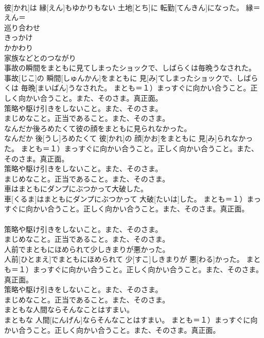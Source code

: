 \documentclass[8pt]{extreport}
\begin{document}
\begin{CJK}{UTF8}{min}
{\\	彼[かれ]は 縁[えん]もゆかりもない 土地[とち]に 転勤[てんきん]になった。	縁＝えん＝ 
\\	巡り合わせ
\\	きっかけ
\\	かかわり
\\	家族などとのつながり
\\	事故の瞬間をまともに見てしまったショックで、しばらくは毎晩うなされた。	
\\	事故[じこ]の 瞬間[しゅんかん]をまともに 見[み]てしまったショックで、しばらくは 毎晩[まいばん]うなされた。	まとも＝１）まっすぐに向かい合うこと。正しく向かい合うこと。また、そのさま。真正面。 　　　　
\\	策略や駆け引きをしないこと。また、そのさま。 　　　　
\\	まじめなこと。正当であること。また、そのさま。
\\	なんだか後ろめたくて彼の顔をまともに見られなかった。	
\\	なんだか 後[うし]ろめたくて 彼[かれ]の 顔[かお]をまともに 見[み]られなかった。	まとも＝１）まっすぐに向かい合うこと。正しく向かい合うこと。また、そのさま。真正面。 　　　　
\\	策略や駆け引きをしないこと。また、そのさま。 　　　　
\\	まじめなこと。正当であること。また、そのさま。
\\	車はまともにダンプにぶつかって大破した。	
\\	車[くるま]はまともにダンプにぶつかって 大破[たいは]した。	まとも＝１）まっすぐに向かい合うこと。正しく向かい合うこと。また、そのさま。真正面。 　　　　
\\	策略や駆け引きをしないこと。また、そのさま。 　　　　
\\	まじめなこと。正当であること。また、そのさま。
\\	人前でまともにほめられて少しきまりが悪かった。	
\\	人前[ひとまえ]でまともにほめられて 少[すこ]しきまりが 悪[わる]かった。	まとも＝１）まっすぐに向かい合うこと。正しく向かい合うこと。また、そのさま。真正面。 　　　　
\\	策略や駆け引きをしないこと。また、そのさま。 　　　　
\\	まじめなこと。正当であること。また、そのさま。
\\	まともな人間ならそんなことはすまい。	
\\	まともな 人間[にんげん]ならそんなことはすまい。	まとも＝１）まっすぐに向かい合うこと。正しく向かい合うこと。また、そのさま。真正面。 　　　　
}
\end{CJK}
\end{document}
